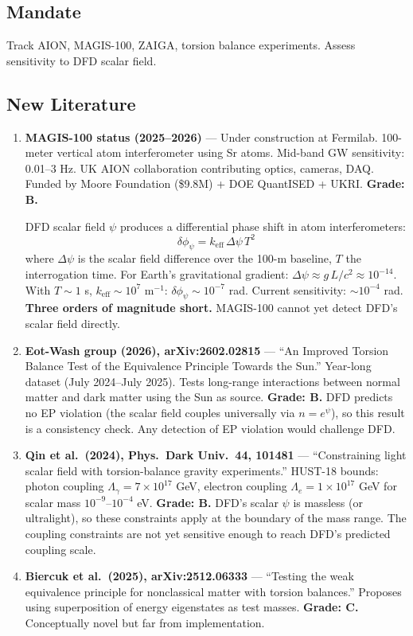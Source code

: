\documentclass[11pt,a4paper]{article}
\begin{document}
\subsection{Mandate}
Track AION, MAGIS-100, ZAIGA, torsion balance experiments. Assess sensitivity to DFD scalar field.

\subsection{New Literature}

\begin{enumerate}

\item \textbf{MAGIS-100 status (2025--2026)} --- Under construction at Fermilab. 100-meter vertical atom interferometer using Sr atoms. Mid-band GW sensitivity: 0.01--3 Hz. UK AION collaboration contributing optics, cameras, DAQ. Funded by Moore Foundation (\$9.8M) + DOE QuantISED + UKRI. \textbf{Grade: B.}

DFD scalar field $\psi$ produces a differential phase shift in atom interferometers:
\begin{equation}
\delta\phi_\psi = k_\mathrm{eff}\,\Delta\psi\,T^2
\end{equation}
where $\Delta\psi$ is the scalar field difference over the 100-m baseline, $T$ the interrogation time. For Earth's gravitational gradient: $\Delta\psi \approx g\,L/c^2 \approx 10^{-14}$. With $T \sim 1$ s, $k_\mathrm{eff} \sim 10^7$ m$^{-1}$: $\delta\phi_\psi \sim 10^{-7}$ rad. Current sensitivity: $\sim 10^{-4}$ rad. \textbf{Three orders of magnitude short.} MAGIS-100 cannot yet detect DFD's scalar field directly.

\item \textbf{Eot-Wash group (2026), arXiv:2602.02815} --- ``An Improved Torsion Balance Test of the Equivalence Principle Towards the Sun.'' Year-long dataset (July 2024--July 2025). Tests long-range interactions between normal matter and dark matter using the Sun as source. \textbf{Grade: B.} DFD predicts no EP violation (the scalar field couples universally via $n = e^\psi$), so this result is a consistency check. Any detection of EP violation would challenge DFD.

\item \textbf{Qin et al.\ (2024), Phys.\ Dark Univ.\ 44, 101481} --- ``Constraining light scalar field with torsion-balance gravity experiments.'' HUST-18 bounds: photon coupling $\Lambda_\gamma = 7\times10^{17}$ GeV, electron coupling $\Lambda_e = 1\times10^{17}$ GeV for scalar mass $10^{-9}$--$10^{-4}$ eV. \textbf{Grade: B.} DFD's scalar $\psi$ is massless (or ultralight), so these constraints apply at the boundary of the mass range. The coupling constraints are not yet sensitive enough to reach DFD's predicted coupling scale.

\item \textbf{Biercuk et al.\ (2025), arXiv:2512.06333} --- ``Testing the weak equivalence principle for nonclassical matter with torsion balances.'' Proposes using superposition of energy eigenstates as test masses. \textbf{Grade: C.} Conceptually novel but far from implementation.

\end{enumerate}
\end{document}

